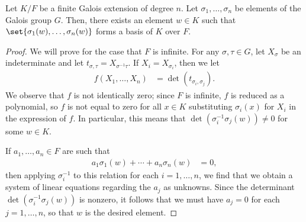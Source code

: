 \documentclass[10pt]{mypackage}
\begin{document}
\begin{theorem}
  Let $K/F$ be a finite Galois extension of degree $n$. Let $\sigma_1,\dots,\sigma_n$ be elements of the Galois group $G$. Then, there exists an element $w\in K$ such that $\set{\sigma_1(w),\dots,\sigma_n(w)}$ forms a basis of $K$ over $F$.
\end{theorem}
\begin{proof}
  We will prove for the case that $F$ is infinite. For any $\sigma,\tau\in G$, let $X_{\sigma}$ be an indeterminate and let $t_{\sigma,\tau} = X_{\sigma^{-1}\tau}$. If $X_i = X_{\sigma_i}$, then we let
  \begin{align*}
    f\left( X_1,\dots,X_n \right) &= \det \left( t_{\sigma_i,\sigma_j} \right).
  \end{align*}
  We observe that $f$ is not identically zero; since $F$ is infinite, $f$ is reduced as a polynomial, so $f$ is not equal to zero for all $x\in K$ substituting $\sigma_i(x)$ for $X_i$ in the expression of $f$. In particular, this means that $\det\left( \sigma_i^{-1}\sigma_j(w) \right) \neq 0$ for some $w\in K$.

  If $a_1,\dots,a_n\in F$ are such that
  \begin{align*}
    a_1\sigma_1(w) + \cdots + a_n\sigma_n(w) &= 0,
  \end{align*}
  then applying $\sigma_i^{-1}$ to this relation for each $i=1,\dots,n$, we find that we obtain a system of linear equations regarding the $a_j$ as unknowns. Since the determinant $\det\left( \sigma_i^{-1}\sigma_j(w) \right)$ is nonzero, it follows that we must have $a_j = 0$ for each $j=1,\dots,n$, so that $w$ is the desired element.
\end{proof}
\end{document}

